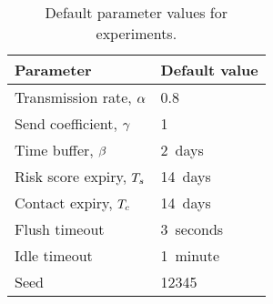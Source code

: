 \begin{table}[tbp]
  \centering
  \begin{tabular}{ll}
    \toprule
    Parameter & Default value \\
    \midrule
    Transmission rate, $\alpha$ & \num{0.8}\\
    Send coefficient, $\gamma$ & \num{1}\\
    Time buffer, $\beta$ & \qty{2}{days}\\
    Risk score expiry, $T_s$ & \qty{14}{days}\\
    Contact expiry, $T_c$ & \qty{14}{days}\\
    Flush timeout & \qty{3}{seconds}\\
    Idle timeout & \qty{1}{minute}\\
    Seed & \num{12345}\\
    \bottomrule
  \end{tabular}
  \caption[Default parameter values for experiments]{Default parameter values for experiments.}
  \label{tab:default-parameters}
\end{table}

